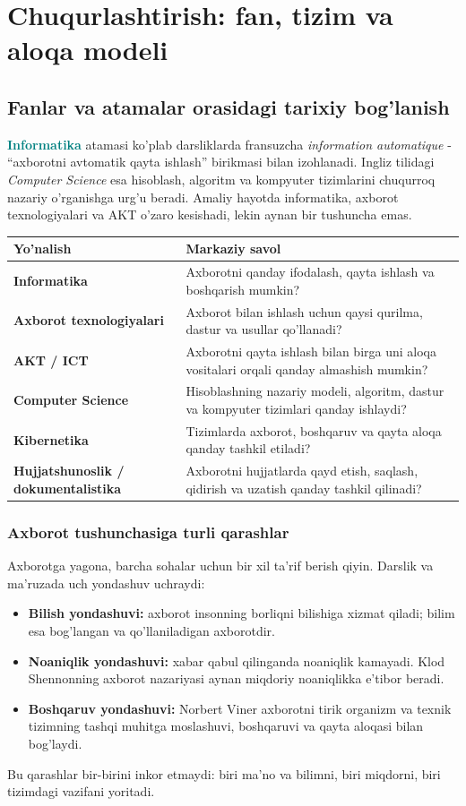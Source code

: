 \documentclass[11pt,a4paper,oneside]{book}
\newcommand{\term}[1]{\textbf{\textcolor{Teal}{#1}}\index{#1}}
\newcommand{\eng}[1]{\textit{\textcolor{Muted}{#1}}}
\begin{document}
\section{Chuqurlashtirish: fan, tizim va aloqa modeli}
\subsection{Fanlar va atamalar orasidagi tarixiy bog'lanish}
\term{Informatika} atamasi ko'plab darsliklarda fransuzcha \eng{information automatique} - “axborotni avtomatik qayta ishlash” birikmasi bilan izohlanadi. Ingliz tilidagi \eng{Computer Science} esa hisoblash, algoritm va kompyuter tizimlarini chuqurroq nazariy o'rganishga urg'u beradi. Amaliy hayotda informatika, axborot texnologiyalari va AKT o'zaro kesishadi, lekin aynan bir tushuncha emas.

\begin{tabularx}{\textwidth}{>{\sffamily\bfseries}p{}X}
\toprule
Yo'nalish & Markaziy savol\\
\midrule
Informatika & Axborotni qanday ifodalash, qayta ishlash va boshqarish mumkin?\\
Axborot texnologiyalari & Axborot bilan ishlash uchun qaysi qurilma, dastur va usullar qo'llanadi?\\
AKT / ICT & Axborotni qayta ishlash bilan birga uni aloqa vositalari orqali qanday almashish mumkin?\\
Computer Science & Hisoblashning nazariy modeli, algoritm, dastur va kompyuter tizimlari qanday ishlaydi?\\
Kibernetika & Tizimlarda axborot, boshqaruv va qayta aloqa qanday tashkil etiladi?\\
Hujjatshunoslik / dokumentalistika & Axborotni hujjatlarda qayd etish, saqlash, qidirish va uzatish qanday tashkil qilinadi?\\
\bottomrule
\end{tabularx}

\subsubsection{Axborot tushunchasiga turli qarashlar}
Axborotga yagona, barcha sohalar uchun bir xil ta'rif berish qiyin. Darslik va ma'ruzada uch yondashuv uchraydi:
\begin{itemize}
\item \textbf{Bilish yondashuvi:} axborot insonning borliqni bilishiga xizmat qiladi; bilim esa bog'langan va qo'llaniladigan axborotdir.
\item \textbf{Noaniqlik yondashuvi:} xabar qabul qilinganda noaniqlik kamayadi. Klod Shennonning axborot nazariyasi aynan miqdoriy noaniqlikka e'tibor beradi.
\item \textbf{Boshqaruv yondashuvi:} Norbert Viner axborotni tirik organizm va texnik tizimning tashqi muhitga moslashuvi, boshqaruvi va qayta aloqasi bilan bog'laydi.
\end{itemize}
Bu qarashlar bir-birini inkor etmaydi: biri ma'no va bilimni, biri miqdorni, biri tizimdagi vazifani yoritadi.
\end{document}
